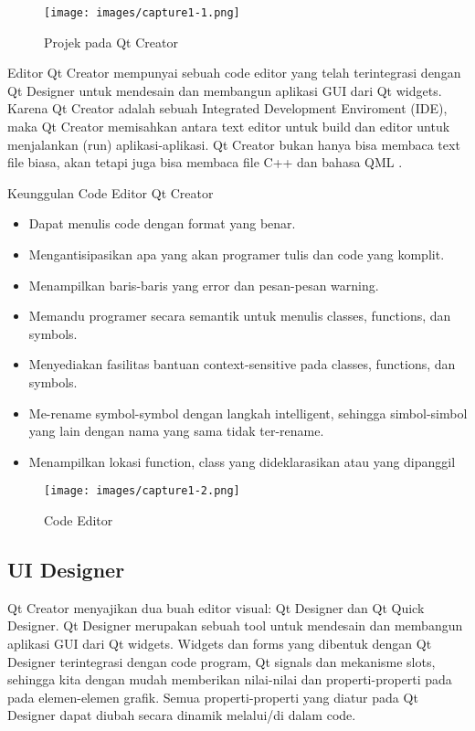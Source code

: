 \begin{figure}[htbp]
\centering 
\texttt{[image: images/capture1-1.png]}
\caption{Projek pada Qt Creator}
\end{figure}\label{projek-pada-qt-creator}

Editor Qt Creator mempunyai sebuah code editor yang telah terintegrasi
dengan Qt Designer untuk mendesain dan membangun aplikasi GUI dari Qt
widgets. Karena Qt Creator adalah sebuah Integrated Development
Enviroment (IDE), maka Qt Creator memisahkan antara text editor untuk
build dan editor untuk menjalankan (run) aplikasi-aplikasi. Qt Creator
bukan hanya bisa membaca text file biasa, akan tetapi juga bisa membaca
file C++ dan bahasa QML .

Keunggulan Code Editor Qt Creator

\begin{itemize}

\item
  Dapat menulis code dengan format yang benar.
\item
  Mengantisipasikan apa yang akan programer tulis dan code yang komplit.
\item
  Menampilkan baris-baris yang error dan pesan-pesan warning.
\item
  Memandu programer secara semantik untuk menulis classes, functions,
  dan symbols.
\item
  Menyediakan fasilitas bantuan context-sensitive pada classes,
  functions, dan symbols.
\item
  Me-rename symbol-symbol dengan langkah intelligent, sehingga
  simbol-simbol yang lain dengan nama yang sama tidak ter-rename.
\item
  Menampilkan lokasi function, class yang dideklarasikan atau yang
  dipanggil
\end{itemize}

\begin{figure}[htbp]
\centering
\texttt{[image: images/capture1-2.png]}
\label{code-editor}
\caption{ Code Editor}
\end{figure}

\subsection{UI Designer}\label{ui-designer}

Qt Creator menyajikan dua buah editor visual: Qt Designer  dan Qt Quick
Designer. Qt Designer merupakan sebuah tool untuk mendesain dan
membangun aplikasi GUI dari Qt widgets. Widgets dan forms yang dibentuk
dengan Qt Designer terintegrasi dengan code program, Qt signals dan
mekanisme slots, sehingga kita dengan mudah memberikan nilai-nilai dan
properti-properti pada pada elemen-elemen grafik. Semua
properti-properti yang diatur pada Qt Designer dapat diubah secara
dinamik melalui/di dalam code.

